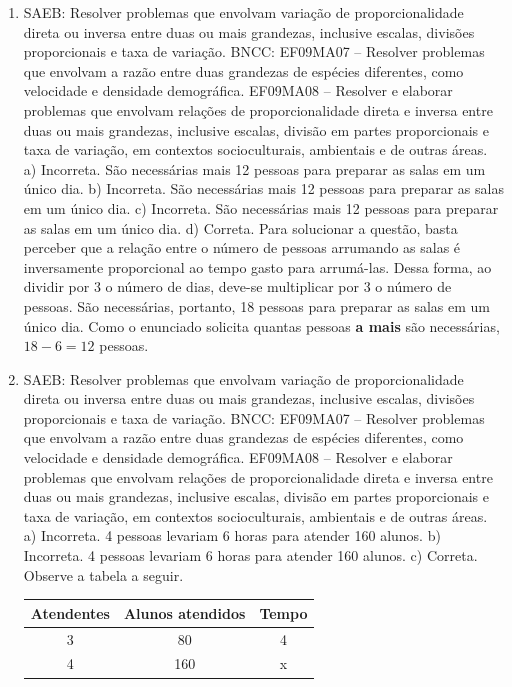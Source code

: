 \begin{enumerate}
\item
SAEB: Resolver problemas que envolvam variação de proporcionalidade 
direta ou inversa entre duas ou mais grandezas, inclusive escalas, divisões 
proporcionais e taxa de variação.
BNCC: EF09MA07 --  Resolver problemas que envolvam a razão entre duas grandezas de espécies diferentes, como velocidade e densidade demográfica.
EF09MA08 -- Resolver e elaborar problemas que envolvam relações de proporcionalidade direta e inversa entre duas ou mais grandezas, inclusive escalas, divisão em partes proporcionais e taxa de variação, em contextos socioculturais, ambientais e de outras áreas.
a) Incorreta. São necessárias mais 12 pessoas para preparar as salas em um único dia. 
b) Incorreta. São necessárias mais 12 pessoas para preparar as salas em um único dia. 
c) Incorreta. São necessárias mais 12 pessoas para preparar as salas em um único dia. 
d) Correta. Para solucionar a questão, basta perceber que a relação entre o 
número de pessoas arrumando as salas é inversamente proporcional ao tempo
gasto para arrumá-las. Dessa forma, ao dividir por 3 o número de dias, deve-se
multiplicar por 3 o número de pessoas. São necessárias, portanto, 18 pessoas 
para preparar as salas em um único dia. Como o enunciado solicita quantas
pessoas \textbf{a mais} são necessárias, $18 - 6 = 12$ pessoas.

\item
SAEB: Resolver problemas que envolvam variação de proporcionalidade 
direta ou inversa entre duas ou mais grandezas, inclusive escalas, divisões 
proporcionais e taxa de variação.
BNCC: EF09MA07 --  Resolver problemas que envolvam a razão entre duas grandezas de espécies diferentes, como velocidade e densidade demográfica.
EF09MA08 -- Resolver e elaborar problemas que envolvam relações de proporcionalidade direta e inversa entre duas ou mais grandezas, inclusive escalas, divisão em partes proporcionais e taxa de variação, em contextos socioculturais, ambientais e de outras áreas.
a) Incorreta. 4 pessoas levariam 6 horas para atender 160 alunos.
b) Incorreta. 4 pessoas levariam 6 horas para atender 160 alunos.
c) Correta. Observe a tabela a seguir.


\begin{tabular}{|c|c|c|}
\hline
Atendentes & Alunos atendidos & Tempo \\ \hline
3 & 80 & 4 \\ \hline
4 & 160 & x \\ \hline
\end{tabular}


\end{enumerate}
